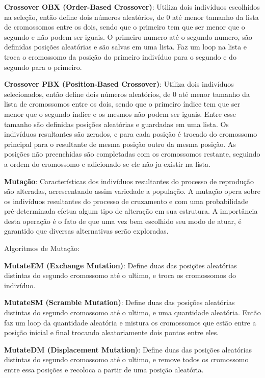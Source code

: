 \textbf{Crossover OBX (Order-Based Crossover)}: Utiliza dois indivíduos escolhidos na seleção, então define dois números aleatórios, de 0 até menor tamanho da lista de cromossomos entre os dois, sendo que o primeiro tem que ser menor que o segundo e não podem ser iguais. O primeiro numero até o segundo numero, são definidas posições aleatórias e são salvas em uma lista. Faz um loop na lista e troca o cromossomo da posição do primeiro indivíduo para o segundo e do segundo para o primeiro.

\textbf{Crossover PBX (Position-Based Crossover)}: Utiliza dois indivíduos selecionados, então define dois números aleatórios, 
de 0 até menor tamanho da lista de cromossomos entre os dois, sendo que o primeiro índice tem que ser menor que o segundo índice e os mesmos não podem ser iguais. 
Entre esse tamanho são definidas posições aleatórias e guardadas em uma lista. Os indivíduos resultantes são zerados, 
e para cada posição é trocado do cromossomo principal para o resultante de mesma posição outro da mesma posição. 
As posições não preenchidas são completadas com os cromossomos restante, seguindo a ordem do cromossomo e adicionado se ele não ja existir na lista.

\textbf{Mutação}: Características dos indivíduos resultantes do processo de reprodução são alteradas, acrescentando assim variedade a população.
A mutação opera sobre os indivíduos resultantes do processo de cruzamento e com uma probabilidade pré-determinada efetua algum tipo de alteração em sua  estrutura. A importância desta operação é o fato de que uma vez bem escolhido seu modo de atuar, é garantido que diversas alternativas serão exploradas.

Algoritmos de Mutação:

\textbf{MutateEM (Exchange Mutation)}: Define duas das posições aleatórias distintas do segundo cromossomo até o ultimo, e troca os cromossomos do indivíduo.

\textbf{MutateSM (Scramble Mutation)}: Define duas das posições aleatórias distintas do segundo cromossomo até o ultimo, e uma quantidade aleatória. Então faz um loop da quantidade aleatória e mistura os cromossomos que estão entre a posição inicial e final trocando aleatoriamente dois pontos entre eles.

\textbf{MutateDM (Displacement Mutation)}: Define duas das posições aleatórias distintas do segundo cromossomo até o ultimo, e remove todos os cromossomo entre essa posições e recoloca a partir de uma posição aleatória.

